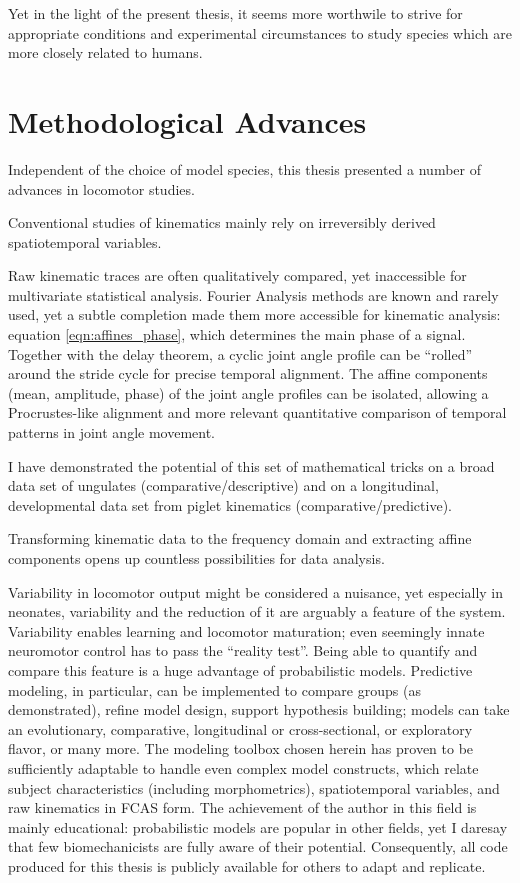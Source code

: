 Yet in the light of the present thesis, it seems more worthwile to strive for appropriate conditions and experimental circumstances to study species which are more closely related to humans.


\section{Methodological Advances}
\label{sec:org3e28dbf}
Independent of the choice of model species, this thesis presented a number of advances in locomotor studies.


Conventional studies of kinematics mainly rely on irreversibly derived spatiotemporal variables.

Raw kinematic traces are often qualitatively compared, yet inaccessible for multivariate statistical analysis.
Fourier Analysis methods are known and rarely used, yet a subtle completion made them more accessible for kinematic analysis: equation \eqref{eqn:affines_phase}, which determines the main phase of a signal.
Together with the delay theorem, a cyclic joint angle profile can be ``rolled'' around the stride cycle for precise temporal alignment.
The affine components (mean, amplitude, phase) of the joint angle profiles can be isolated, allowing a Procrustes-like alignment and more relevant quantitative comparison of temporal patterns in joint angle movement.

I have demonstrated the potential of this set of mathematical tricks on a broad data set of ungulates (comparative/descriptive) and on a longitudinal, developmental data set from piglet kinematics (comparative/predictive).


Transforming kinematic data to the frequency domain and extracting affine components opens up countless possibilities for data analysis.

Variability in locomotor output might be considered a nuisance, yet especially in neonates, variability and the reduction of it are arguably a feature of the system.
Variability enables learning and locomotor maturation; even seemingly innate neuromotor control has to pass the ``reality test''.
Being able to quantify and compare this feature is a huge advantage of probabilistic models.
Predictive modeling, in particular, can be implemented to compare groups (as demonstrated), refine model design, support hypothesis building; models can take an evolutionary, comparative, longitudinal or cross-sectional, or exploratory flavor, or many more.
The modeling toolbox chosen herein has proven to be sufficiently adaptable to handle even complex model constructs, which relate subject characteristics (including morphometrics), spatiotemporal variables, and raw kinematics in FCAS form.
The achievement of the author in this field is mainly educational: probabilistic models are popular in other fields, yet I daresay that few biomechanicists are fully aware of their potential.
Consequently, all code produced for this thesis is publicly available for others to adapt and replicate.

